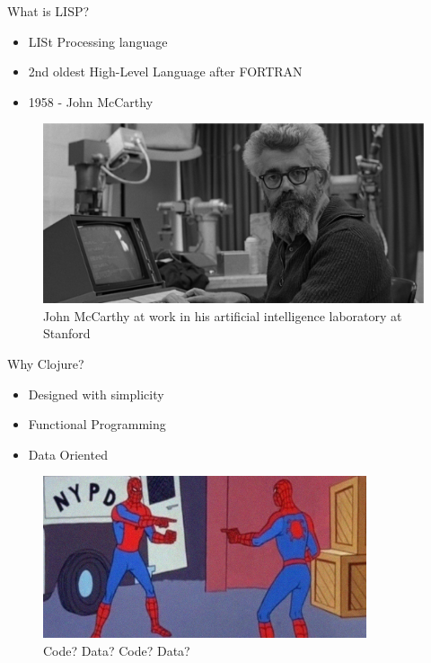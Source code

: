 \documentclass[ignorenonframetext,]{beamer}
\providecommand{\tightlist}{%
  \setlength{\itemsep}{0pt}\setlength{\parskip}{0pt}}
\begin{document}
\begin{frame}{What is LISP?}
\protect\hypertarget{what-is-lisp-1}{}

\begin{itemize}
\tightlist
\item
  LISt Processing language
\item
  2nd oldest High-Level Language after FORTRAN
\item
  1958 - John McCarthy
\end{itemize}

\begin{figure}
\centering
\includegraphics{john_mccarthy.jpg}
\caption{John McCarthy at work in his artificial intelligence laboratory
at Stanford}
\end{figure}

\end{frame}

\begin{frame}{Why Clojure?}
\protect\hypertarget{why-clojure}{}

\begin{itemize}
\tightlist
\item
  Designed with simplicity
\item
  Functional Programming
\item
  Data Oriented
\end{itemize}

\begin{figure}
\centering
\includegraphics[width=3.75in,height=\textheight]{spiderman-pointing-meme.jpg}
\caption{Code? Data? Code? Data?}
\end{figure}

\end{frame}
\end{document}
